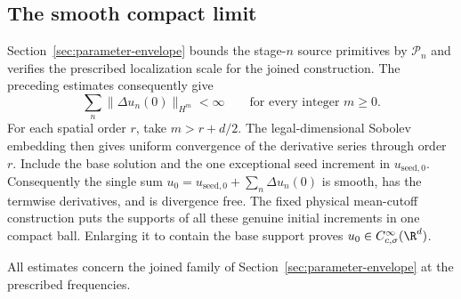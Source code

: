 \subsection{The smooth compact limit}
Section~\ref{sec:parameter-envelope} bounds the stage-$n$ source
primitives by $\mathcal P_n$ and verifies the prescribed localization
scale for the joined construction. The preceding estimates consequently give
\[
 \sum_n\|\Delta u_n(0)\|_{H^m}<\infty
 \qquad\text{for every integer }m\ge0.
\]
For each spatial order $r$, take $m>r+d/2$. The legal-dimensional Sobolev
embedding then gives uniform convergence of the derivative series through
order $r$. Include the base solution and the one exceptional seed increment in
$u_{\mathrm{seed},0}$. Consequently the single sum
$u_0=u_{\mathrm{seed},0}+\sum_n\Delta u_n(0)$ is smooth, has the termwise
derivatives, and is divergence free. The fixed physical mean-cutoff
construction puts the supports of all these genuine initial increments
in one compact ball. Enlarging it to contain the base support proves
$u_0\in C^\infty_{c,\sigma}(\R^d)$.

All estimates concern the joined family of
Section~\ref{sec:parameter-envelope} at the prescribed frequencies.
